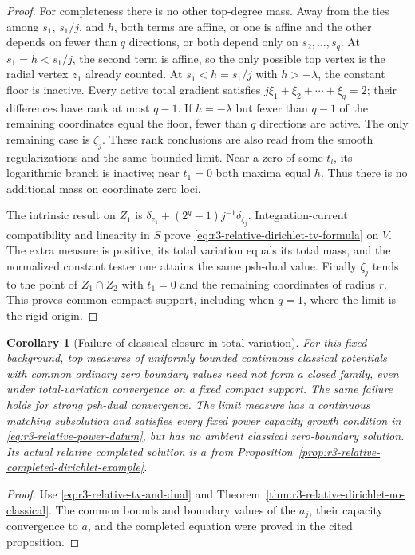 \documentclass[11pt,a4paper]{article}
\numberwithin{equation}{section}
\newtheorem{corollary}[theorem]{Corollary}
\theoremstyle{definition}
\theoremstyle{remark}
\begin{document}
\begin{proof}
For completeness there is no other top-degree mass. Away from
the ties among $s_1$, $s_1/j$, and $h$, both terms are affine,
or one is affine and the other depends on fewer than $q$
directions, or both depend only on $s_2,\ldots,s_q$. At
$s_1=h<s_1/j$, the second term is affine, so the only possible
top vertex is the radial vertex $z_1$ already counted.
At $s_1<h=s_1/j$ with $h>-\lambda$, the constant floor is
inactive. Every active total gradient satisfies
$j\xi_1+\xi_2+\cdots+\xi_q=2$; their differences have rank
at most $q-1$. If $h=-\lambda$ but fewer than $q-1$ of the
remaining coordinates equal the floor, fewer than $q$ directions
are active. The only remaining case is $\zeta_j$.
These rank conclusions are also read from the smooth
regularizations and the same bounded limit. Near a zero of
some $t_l$, its logarithmic branch is inactive; near $t_1=0$
both maxima equal $h$. Thus there is no additional mass on
coordinate zero loci.

The intrinsic result on $Z_1$ is
$\delta_{z_1}+(2^q-1)j^{-1}\delta_{\zeta_j}$.
Integration-current compatibility and linearity in $S$ prove
\eqref{eq:r3-relative-dirichlet-tv-formula} on $V$.
The extra measure is positive; its total variation equals its
total mass, and the normalized constant tester one attains the
same psh-dual value. Finally $\zeta_j$ tends to the point of
$Z_1\cap Z_2$ with $t_1=0$ and the remaining coordinates of
radius $r$. This proves common compact support, including when
$q=1$, where the limit is the rigid origin.
\end{proof}

\begin{corollary}[Failure of classical closure in total variation]
\label{cor:r3-relative-dirichlet-not-tv-closed}
For this fixed background, top measures of uniformly bounded
continuous classical potentials with common ordinary zero
boundary values need not form a closed family, even under
total-variation convergence on a fixed compact support.
The same failure holds for strong psh-dual convergence. The
limit measure has a continuous matching subsolution and satisfies
every fixed power capacity growth condition in
\eqref{eq:r3-relative-power-datum}, but has no ambient classical
zero-boundary solution. Its actual relative completed solution
is $a$ from Proposition~\ref{prop:r3-relative-completed-dirichlet-example}.
\end{corollary}

\begin{proof}
Use \eqref{eq:r3-relative-tv-and-dual} and
Theorem~\ref{thm:r3-relative-dirichlet-no-classical}.
The common bounds and boundary values of the $a_j$, their
capacity convergence to $a$, and the completed equation were
proved in the cited proposition.
\end{proof}
\end{document}

